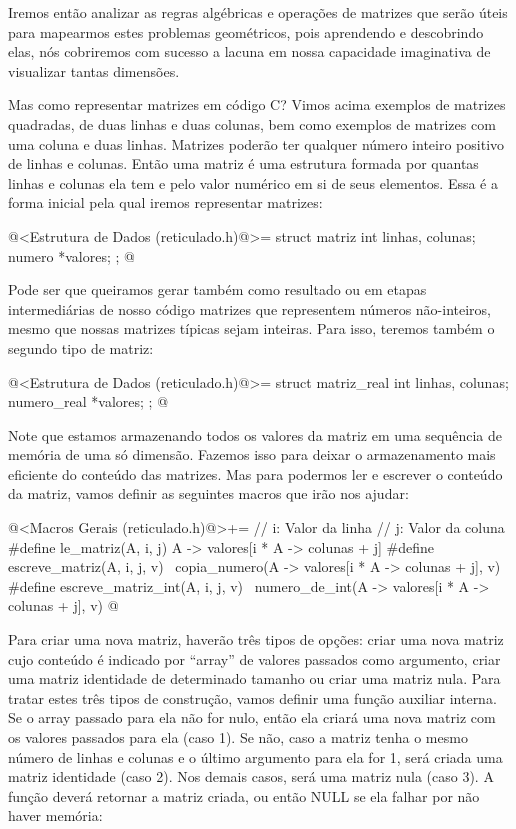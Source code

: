 Iremos então analizar as regras algébricas e operações de matrizes que
serão úteis para mapearmos estes problemas geométricos, pois
aprendendo e descobrindo elas, nós cobriremos com sucesso a lacuna em
nossa capacidade imaginativa de visualizar tantas dimensões.

Mas como representar matrizes em código C? Vimos acima exemplos de
matrizes quadradas, de duas linhas e duas colunas, bem como exemplos
de matrizes com uma coluna e duas linhas. Matrizes poderão ter
qualquer número inteiro positivo de linhas e colunas. Então uma matriz
é uma estrutura formada por quantas linhas e colunas ela tem e pelo
valor numérico em si de seus elementos. Essa é a forma inicial pela
qual iremos representar matrizes:

\iniciocodigo
@<Estrutura de Dados (reticulado.h)@>=
struct matriz{
  int linhas, colunas;
  numero *valores;
};
@
\fimcodigo

Pode ser que queiramos gerar também como resultado ou em etapas
intermediárias de nosso código matrizes que representem números
não-inteiros, mesmo que nossas matrizes típicas sejam inteiras. Para
isso, teremos também o segundo tipo de matriz:

\iniciocodigo
@<Estrutura de Dados (reticulado.h)@>=
struct matriz_real{
  int linhas, colunas;
  numero_real *valores;
};
@
\fimcodigo


Note que estamos armazenando todos os valores da matriz em uma
sequência de memória de uma só dimensão. Fazemos isso para deixar o
armazenamento mais eficiente do conteúdo das matrizes. Mas para
podermos ler e escrever o conteúdo da matriz, vamos definir as
seguintes macros que irão nos ajudar:

\iniciocodigo
@<Macros Gerais (reticulado.h)@>+=
// i: Valor da linha     // j: Valor da coluna
#define le_matriz(A, i, j) A -> valores[i * A -> colunas + j]
#define escreve_matriz(A, i, j, v)                    \
        copia_numero(A -> valores[i * A -> colunas + j], v)
#define escreve_matriz_int(A, i, j, v)                \
        numero_de_int(A -> valores[i * A -> colunas + j], v)
@
\fimcodigo

Para criar uma nova matriz, haverão três tipos de opções: criar uma
nova matriz cujo conteúdo é indicado por ``array'' de valores passados
como argumento, criar uma matriz identidade de determinado tamanho ou
criar uma matriz nula. Para tratar estes três tipos de construção,
vamos definir uma função auxiliar interna. Se o array passado para ela
não for nulo, então ela criará uma nova matriz com os valores passados
para ela (caso 1). Se não, caso a matriz tenha o mesmo número de
linhas e colunas e o último argumento para ela for 1, será criada uma
matriz identidade (caso 2). Nos demais casos, será uma matriz nula
(caso 3). A função deverá retornar a matriz criada, ou então NULL se
ela falhar por não haver memória:

